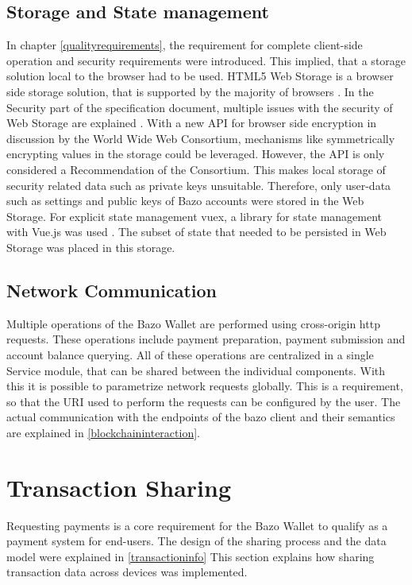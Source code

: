 \subsection{Storage and State management\label{storageandstate}}
In chapter \ref{qualityrequirements}, the requirement for complete client-side operation and security requirements were introduced. This implied, that a storage solution local to the browser had to be used. HTML5 Web Storage is a browser side storage solution, that is supported by the majority of browsers \cite{localstoragetest} \cite{localstorage}.
In the Security part of the specification document, multiple issues with the security of Web Storage are explained \cite{localstorage}.
With a new API for browser side encryption in discussion by the World Wide Web Consortium, mechanisms like symmetrically encrypting values in the storage could be leveraged. However, the API is only considered a Recommendation of the Consortium\cite{webcrypto}.
This makes local storage of security related data such as private keys unsuitable. Therefore, only user-data such as settings and public keys of Bazo accounts were stored in the Web Storage. For explicit state management vuex, a library for state management with Vue.js was used \cite{vuex}. The subset of state that needed to be persisted in Web Storage was placed in this storage.
\subsection{Network Communication}
Multiple operations of the Bazo Wallet are performed using cross-origin http requests. These operations include payment preparation, payment submission and account balance querying. All of these operations are centralized in a single Service module, that can be shared between the individual components. With this it is possible to parametrize network requests globally. This is a requirement, so that the URI used to perform the requests can be configured by the user. The actual communication with the endpoints of the bazo client and their semantics are explained in \ref{blockchaininteraction}.

\section{Transaction Sharing}
Requesting payments is a core requirement for the Bazo Wallet to qualify as a payment system for end-users. The design of the sharing process and the data model were explained in \ref{transactioninfo} This section explains how sharing transaction data across devices was implemented.

